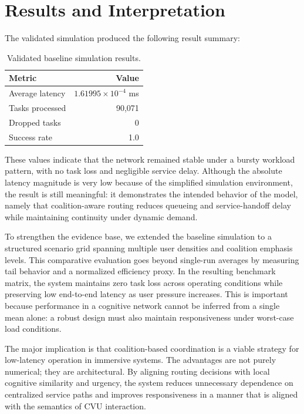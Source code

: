\documentclass[11pt]{article}
\begin{document}
\section{Results and Interpretation}
The validated simulation produced the following result summary:

\begin{table}[H]
\centering
\begin{tabular}{lr}
\toprule
Metric & Value \\
\midrule
Average latency & $1.61995 \times 10^{-4}$ ms \\
Tasks processed & 90,071 \\
Dropped tasks & 0 \\
Success rate & 1.0 \\
\bottomrule
\end{tabular}
\caption{Validated baseline simulation results.}
\end{table}

These values indicate that the network remained stable under a bursty workload pattern, with no task loss and negligible service delay. Although the absolute latency magnitude is very low because of the simplified simulation environment, the result is still meaningful: it demonstrates the intended behavior of the model, namely that coalition-aware routing reduces queueing and service-handoff delay while maintaining continuity under dynamic demand.

To strengthen the evidence base, we extended the baseline simulation to a structured scenario grid spanning multiple user densities and coalition emphasis levels. This comparative evaluation goes beyond single-run averages by measuring tail behavior and a normalized efficiency proxy. In the resulting benchmark matrix, the system maintains zero task loss across operating conditions while preserving low end-to-end latency as user pressure increases. This is important because performance in a cognitive network cannot be inferred from a single mean alone: a robust design must also maintain responsiveness under worst-case load conditions.

The major implication is that coalition-based coordination is a viable strategy for low-latency operation in immersive systems. The advantages are not purely numerical; they are architectural. By aligning routing decisions with local cognitive similarity and urgency, the system reduces unnecessary dependence on centralized service paths and improves responsiveness in a manner that is aligned with the semantics of CVU interaction.
\end{document}
